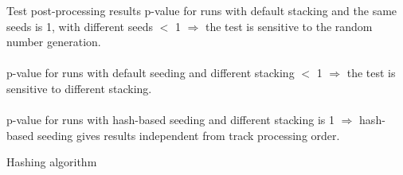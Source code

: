\documentclass[aspectratio=169, 14pt]{beamer}
\begin{document}
\begin{large}
 \begin{frame}{Test post-processing results}
  p-value for runs with default stacking and the same seeds is 1, with different seeds $<$ 1
  $\Rightarrow$ the test is sensitive to the random number generation.\\\ \\
  p-value for runs with default seeding and different stacking $<$ 1
  $\Rightarrow$ the test is sensitive to different stacking.\\\ \\
  p-value for runs with hash-based seeding and different stacking is 1
  $\Rightarrow$ hash-based seeding gives results independent from track processing order.
 \end{frame}
 
 \begin{frame}{Hashing algorithm}
  \scalebox{.5}{}
 \end{frame}
 
 \end{large}
\end{document}
